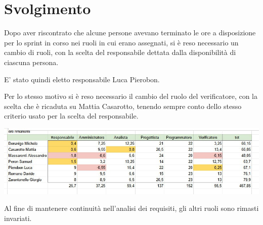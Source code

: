 \section{Svolgimento}

Dopo aver riscontrato che alcune persone avevano terminato le ore a disposizione per lo sprint in corso nei ruoli in cui erano assegnati, si è reso necessario un cambio di ruoli, con la scelta del responsabile dettata dalla disponibilità di ciascuna persona.

E' stato quindi eletto responsabile Luca Pierobon.

Per lo stesso motivo si è reso necessario il cambio del ruolo del verificatore, con la scelta che è ricaduta su Mattia Casarotto, tenendo sempre conto dello stesso criterio usato per la scelta del responsabile.

\begin{center}
    \includegraphics[width = 0.9\linewidth]{img/tabella-ore.jpg}
\end{center}

Al fine di mantenere continuità nell'analisi dei requisiti, gli altri ruoli sono rimasti invariati.
